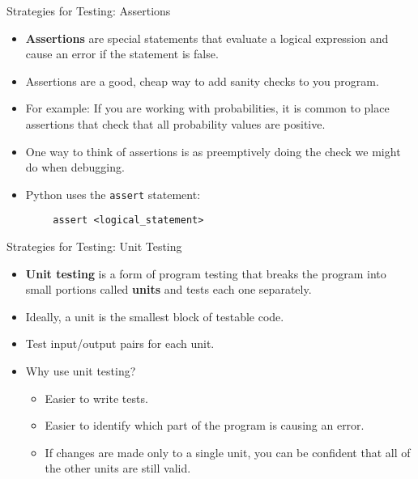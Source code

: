\documentclass[serif,xcolor=pdftex,dvipsnames,table,hyperref={bookmarks=false,breaklinks}]{beamer}
\begin{document}
\begin{frame}[t,fragile]{Strategies for Testing: Assertions}
	\begin{itemize}[<+->]
		\item \textbf{Assertions} are special statements that evaluate a logical expression and cause an error if the statement is false.
		\item Assertions are a good, cheap way to add sanity checks to you program.
		\item For example: If you are working with probabilities, it is common to place assertions that check that all probability values are positive.
		\item One way to think of assertions is as preemptively doing the check we might do when debugging.
		\item Python uses the \verb|assert| statement:
	\end{itemize}
	\pause
	\begin{lstlisting}
		assert <logical_statement>
	\end{lstlisting}

\end{frame}

\begin{frame}[t]{Strategies for Testing: Unit Testing}
	\begin{itemize}[<+->]
		\item \textbf{Unit testing} is a form of program testing that breaks the program into small portions called \textbf{units} and tests each one separately.
		\item Ideally, a unit is the smallest block of testable code.
		\item Test input/output pairs for each unit.
		\item Why use unit testing?
		\begin{itemize}[<+->]
			\item Easier to write tests.
			\item Easier to identify which part of the program is causing an error.
			\item If changes are made only to a single unit, you can be confident that all of the other units are still valid.
		\end{itemize}
	\end{itemize}
\end{frame}

\begin{frame}[t]{Strategies for Testing: Unit Testing}
	\centering
	\texttt{[image: \{../Figures/array\_slicing/Slide36]}.png}
\end{frame}
\end{document}
